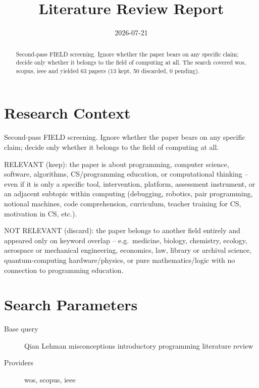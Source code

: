 \documentclass{article}
\title{Literature Review Report}
\date{2026-07-21}
\begin{document}
\maketitle

\begin{abstract}
Second-pass FIELD screening. Ignore whether the paper bears on any specific claim; decide only whether it belongs to the field of computing at all. The search covered wos, scopus, ieee and yielded 63 papers (13 kept, 50 discarded, 0 pending).
\end{abstract}
\clearpage
\clearpage
\tableofcontents
\clearpage

\section{Research Context}
Second-pass FIELD screening. Ignore whether the paper bears on any
specific claim; decide only whether it belongs to the field of computing
at all.

RELEVANT (keep): the paper is about programming, computer science,
software, algorithms, CS/programming education, or computational
thinking -- even if it is only a specific tool, intervention, platform,
assessment instrument, or an adjacent subtopic within computing
(debugging, robotics, pair programming, notional machines, code
comprehension, curriculum, teacher training for CS, motivation in CS,
etc.).

NOT RELEVANT (discard): the paper belongs to another field entirely and
appeared only on keyword overlap -- e.g.~medicine, biology, chemistry,
ecology, aerospace or mechanical engineering, economics, law, library or
archival science, quantum-computing hardware/physics, or pure
mathematics/logic with no connection to programming education.

\section{Search Parameters}

\begin{description}
\item[Base query] Qian Lehman misconceptions introductory programming literature review
\item[Providers] wos, scopus, ieee
\end{description}
\end{document}
